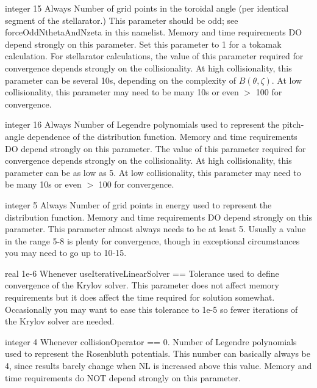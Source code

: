 \myhrule

{integer}
{15}
{Always}
{Number of grid points in the toroidal angle (per identical segment of the stellarator.)  
This parameter should be odd; see {\ttfamily forceOddNthetaAndNzeta} in this namelist.
Memory and time requirements DO depend strongly on this parameter.
Set this parameter to 1 for a tokamak calculation.
For stellarator calculations, the value of this parameter required for convergence depends strongly on
the collisionality. At high collisionality, this parameter can be several 10s, depending
on the complexity of $B(\theta,\zeta)$. At low collisionality, this parameter may need to be many 10s or
even $>$ 100 for convergence.
}

\myhrule

{integer}
{16}
{Always}
{Number of Legendre polynomials used to represent the pitch-angle dependence of the distribution function.
Memory and time requirements DO depend strongly on this parameter.
The value of this parameter required for convergence depends strongly on
the collisionality. At high collisionality, this parameter can be as low
as 5. At low collisionality, this parameter may need to be many 10s or
even $>$ 100 for convergence.}

\myhrule

{integer}
{5}
{Always}
{Number of grid points in energy used to represent the distribution function.
Memory and time requirements DO depend strongly on this parameter.
This parameter almost always needs to be at least 5.
Usually a value in the range 5-8 is plenty for convergence, though in exceptional circumstances
you may need to go up to 10-15.
}

\myhrule

{real}
{1e-6}
{Whenever {\ttfamily useIterativeLinearSolver} == \true}
{
Tolerance used to define convergence of the Krylov solver.
This parameter does not affect memory requirements but it does affect the
time required for solution somewhat.
Occasionally you may want to ease this tolerance to 1e-5 so fewer iterations of the Krylov solver are needed.
}

\myhrule

{integer}
{4}
{Whenever {\ttfamily collisionOperator} == 0.}
{Number of Legendre polynomials used to represent the Rosenbluth
potentials. This number can basically always be 4,
since results barely change when {\ttfamily NL} is increased above this value.
Memory and time requirements do NOT depend strongly on this parameter.
}

